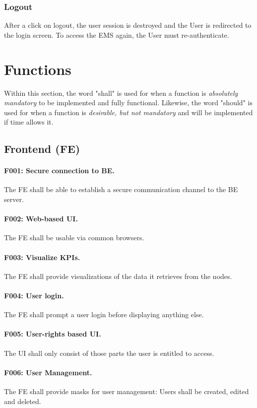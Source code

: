 \documentclass{scrreprt}
\begin{document}
\subsubsection{Logout}
After a click on logout, the user session is destroyed and the User is redirected to the login screen. To access the EMS again, the User must re-authenticate. 

\section{Functions} 
Within this section, the word "shall" is used for when a function is \emph{absolutely mandatory} to be implemented and fully functional.
Likewise, the word "should" is used for when a function is \emph{desirable, but not mandatory} and will be implemented if time allows it.
\subsection{Frontend (FE)}
\paragraph{F001: Secure connection to BE.} The FE shall be able to establish a secure communication channel to the BE server.
\paragraph{F002: Web-based UI.} The FE shall be usable via common browsers.
\paragraph{F003: Visualize KPIs.} The FE shall provide visualizations of the data it retrieves from the nodes.
\paragraph{F004: User login.} The FE shall prompt a user login before displaying anything else.
\paragraph{F005: User-rights based UI.} The UI shall only consist of those parts the user is entitled to access.
\paragraph{F006: User Management.} The FE shall provide masks for user management: Users shall be created, edited and deleted.
\end{document}

